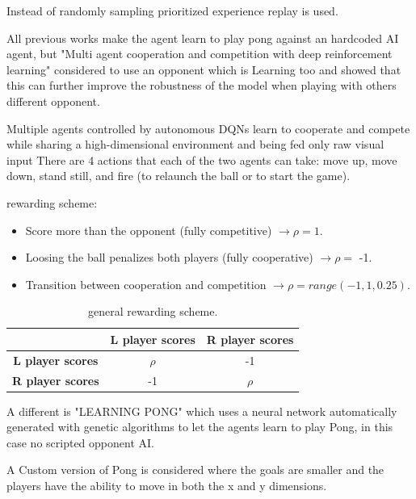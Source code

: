 Instead of randomly sampling prioritized experience replay is used.




All previous works make the agent learn to play pong against an hardcoded AI agent, but "Multi agent cooperation and competition with deep reinforcement learning" considered to use an opponent
which is Learning too and showed that this can further improve the robustness of the model when playing with others different opponent.

Multiple agents controlled by autonomous DQNs learn to cooperate and compete while sharing a high-dimensional environment and being fed only raw visual input
There are 4 actions that each of the two agents can take: move up, move down, stand still, and fire (to relaunch the ball or to start the game).

 rewarding scheme:
\begin{itemize}
  \item Score more than the opponent (fully competitive) $\rightarrow \rho = 1$.
  \item Loosing the ball penalizes both players (fully cooperative) $\rightarrow \rho = $ -1.
  \item Transition between cooperation and competition $\rightarrow \rho = range(-1, 1, 0.25)$.
\end{itemize}

\begin{table}[ht]
  \centering
  \begin{tabular}{c|c|c|}
    \cline{2-3}
                                                   & \textbf{L player scores} & \textbf{R player scores} \\ \hline
    \multicolumn{1}{|c|}{\textbf{L player scores}} & $\rho$                   & -1                       \\ \hline
    \multicolumn{1}{|c|}{\textbf{R player scores}} & -1                       & $\rho$                   \\ \hline
  \end{tabular}
  \caption{general rewarding scheme.}
  \label{tab:my-table2}
\end{table}


A different is "LEARNING PONG" which uses a neural network automatically generated with genetic algorithms to let the agents learn to play Pong, in this case no scripted opponent AI.

A Custom version of Pong is considered where the goals are smaller and the players have the ability to move in both the x and y dimensions.

